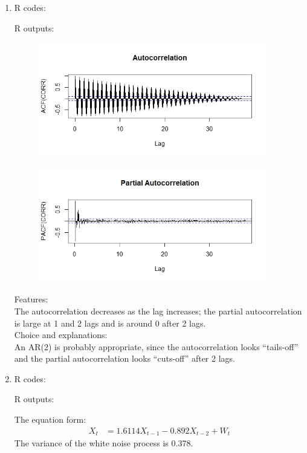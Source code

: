 \documentclass[10pt]{article}
\begin{document}
\begin{enumerate}[1)]
\item
R codes:

R outputs:
\begin{figure}[H]
  \centering
  \includegraphics[width=10cm,height=5cm]{p43a.jpeg}
\end{figure}
\begin{figure}[H]
  \centering
  \includegraphics[width=10cm,height=5cm]{p43b.jpeg}
\end{figure}
Features:\\
The autocorrelation decreases as the lag increases; the partial autocorrelation is large at 1 and 2 lags and is around 0 after 2 lags.\\
Choice and explanations:\\
An AR(2) is probably appropriate, since the autocorrelation looks ``tails-off'' and the partial autocorrelation looks ``cuts-off'' after 2 lags.

\item
R codes:

R outputs:

The equation form:
\begin{align*}
X_t&=1.6114X_{t-1}-0.892X_{t-2}+W_t
\end{align*}
The variance of the white noise process is 0.378.


\end{enumerate}
\end{document}
